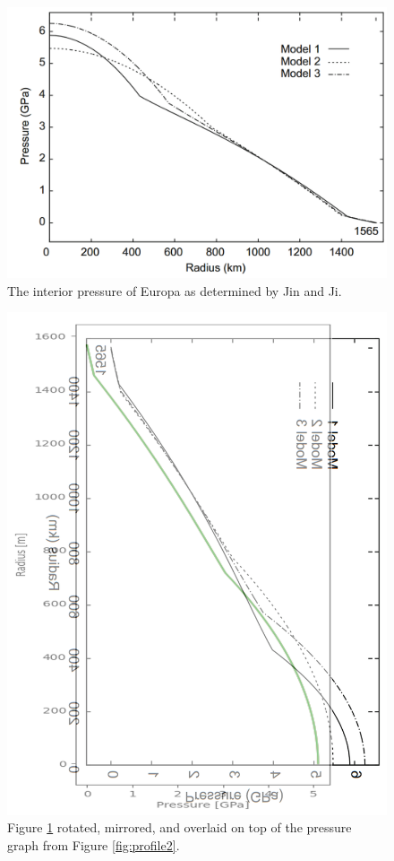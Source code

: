 \documentclass[twocolumn]{article}
\begin{document}
\begin{figure}[h]
	\centering
	\includegraphics[width=\columnwidth]{jinjipressure.png}
	\caption{The interior pressure of Europa as determined by Jin and Ji\cite{jinInternalStructureModels2012}.}
	\label{fig:jinjipressure}
\end{figure}
\begin{figure}[h]
	\centering
	\includegraphics[width=\columnwidth]{comparison.png}
	\caption{Figure \ref{fig:jinjipressure} rotated, mirrored, and overlaid on top of the pressure graph from Figure \ref{fig:profile2}.}
	\label{fig:comparison}
\end{figure}
\end{document}
